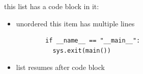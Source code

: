 
this list has a code block in it:

\begin{itemize}
    \item unordered
    this item has multiple lines
    \begin{verbatim}
        if __name__ == "__main__":
          sys.exit(main())
    \end{verbatim}

    \item list resumes after code block

\end{itemize}